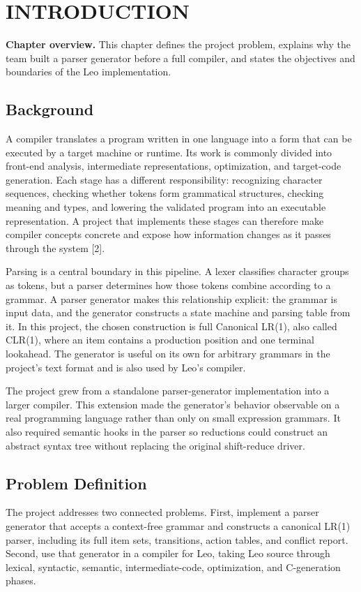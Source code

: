 \documentclass[12pt,a4paper,oneside]{report}
\newcommand{\chapterintro}[1]{\noindent\textbf{Chapter overview.} #1\par\vspace{8pt}}
\begin{document}
\clearpage
{}
\setcounter{page}{1}
\chapter{INTRODUCTION}
\chapterintro{This chapter defines the project problem, explains why the team built a parser generator before a full compiler, and states the objectives and boundaries of the Leo implementation.}

\section{Background}
A compiler translates a program written in one language into a form that can be executed by a target machine or runtime. Its work is commonly divided into front-end analysis, intermediate representations, optimization, and target-code generation. Each stage has a different responsibility: recognizing character sequences, checking whether tokens form grammatical structures, checking meaning and types, and lowering the validated program into an executable representation. A project that implements these stages can therefore make compiler concepts concrete and expose how information changes as it passes through the system [2].

Parsing is a central boundary in this pipeline. A lexer classifies character groups as tokens, but a parser determines how those tokens combine according to a grammar. A parser generator makes this relationship explicit: the grammar is input data, and the generator constructs a state machine and parsing table from it. In this project, the chosen construction is full Canonical LR(1), also called CLR(1), where an item contains a production position and one terminal lookahead. The generator is useful on its own for arbitrary grammars in the project's text format and is also used by Leo's compiler.

The project grew from a standalone parser-generator implementation into a larger compiler. This extension made the generator's behavior observable on a real programming language rather than only on small expression grammars. It also required semantic hooks in the parser so reductions could construct an abstract syntax tree without replacing the original shift-reduce driver.

\section{Problem Definition}
The project addresses two connected problems. First, implement a parser generator that accepts a context-free grammar and constructs a canonical LR(1) parser, including its full item sets, transitions, action tables, and conflict report. Second, use that generator in a compiler for Leo, taking Leo source through lexical, syntactic, semantic, intermediate-code, optimization, and C-generation phases.
\end{document}
